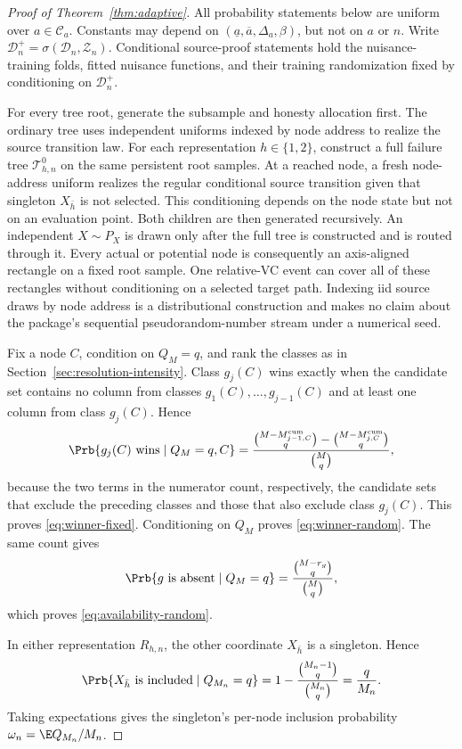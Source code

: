 \begin{appendix}
\begin{proof}[Proof of Theorem~\ref{thm:adaptive}]
All probability statements below are
uniform over \(a\in\mathcal C_a\). Constants may depend on
\((\underline a,\overline a,\Delta_a,\beta)\), but not on \(a\) or \(n\).
Write \(\mathcal D_n^+=\sigma(\mathcal D_n,\mathcal Z_n)\). Conditional
source-proof statements hold the nuisance-training folds, fitted nuisance
functions, and their training randomization fixed by conditioning on
\(\mathcal D_n^+\).

For every tree root, generate the subsample and honesty allocation first. The
ordinary tree uses independent uniforms indexed by node address to realize the
source transition law. For each representation \(h\in\{1,2\}\), construct a full
failure tree \(\mathcal T_{h,n}^0\) on the same persistent root samples. At a
reached node, a fresh node-address uniform realizes the regular conditional
source transition given that singleton \(X_{\bar h}\) is not selected. This
conditioning depends on the node state but not on an evaluation point. Both
children are then generated recursively. An independent \(X\sim P_X\) is drawn
only after the full tree is constructed and is routed through it. Every actual
or potential node is consequently an axis-aligned rectangle on a fixed root
sample. One relative-VC event can cover all of these rectangles without
conditioning on a selected target path. Indexing iid source draws by node
address is a distributional construction and makes no claim about the
package's sequential pseudorandom-number stream under a numerical seed.

Fix a node \(C\), condition on \(Q_M=q\), and rank the classes as in
Section~\ref{sec:resolution-intensity}. Class \(g_j(C)\) wins exactly
when the candidate set contains no column from classes
\(g_1(C),\ldots,g_{j-1}(C)\) and at least one
column from class \(g_j(C)\). Hence
\[
\Prb\{g_j(C)\text{ wins}\mid Q_M=q,C\}
=\frac{\binom{M-M_{j-1,C}^{\rm cum}}q
-\binom{M-M_{j,C}^{\rm cum}}q}{\binom Mq},
\]
because the two terms in the numerator count, respectively, the candidate
sets that exclude the preceding classes and those that also exclude class
\(g_j(C)\). This proves \eqref{eq:winner-fixed}. Conditioning on \(Q_M\)
proves \eqref{eq:winner-random}. The same count gives
\[
\Prb\{g\text{ is absent}\mid Q_M=q\}
=\frac{\binom{M-r_g}q}{\binom Mq},
\]
which proves \eqref{eq:availability-random}.

In either representation \(R_{h,n}\), the other coordinate \(X_{\bar h}\) is a
singleton. Hence
\begin{equation}\label{eq:app-singleton}
\Prb\{X_{\bar h}\text{ is included}\mid Q_{M_n}=q\}
=1-\frac{\binom{M_n-1}q}{\binom{M_n}q}
=\frac q{M_n}.
\end{equation}
Taking expectations gives the singleton's per-node inclusion probability
\(\omega_n=\E Q_{M_n}/M_n\).


\end{proof}
\end{appendix}
